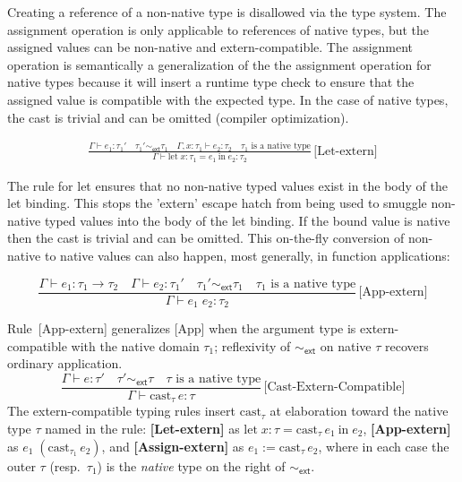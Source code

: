 \documentclass[11pt,a4paper]{article}
\begin{document}
Creating  a reference of a non-native type is disallowed via the type system.
The assignment operation is only applicable to references of native types, but the assigned values can be non-native and extern-compatible. The assignment operation is semantically a generalization of the the assignment operation for native types because it will insert a runtime type check to ensure that the assigned value is compatible with the expected type. In the case of native types, the cast is trivial and can be omitted (compiler optimization).

\begin{gather*}
  \frac{\Gamma \vdash e_1 : \tau_1' \quad \tau_1' \sim_{\textsf{ext}} \tau_1 \quad \Gamma, x{:}\tau_1 \vdash e_2 : \tau_2 \quad \text{$\tau_1$ is a native type}}{\Gamma \vdash \text{let}\; x{:}\tau_1 = e_1\ \text{in}\; e_2 : \tau_2}\,\text{[{Let-extern}]}
\end{gather*}

The rule for let ensures that no non-native typed values exist in the body of the let binding. 
This stops the 'extern' escape hatch from being used to smuggle non-native typed values into the body of the let binding.
If the bound value is native then the cast is trivial and can be omitted.
This on-the-fly conversion of non-native to native values can also happen, most generally, in function applications: 

\[
  \frac{\Gamma \vdash e_1 : \tau_1 \to \tau_2 \quad \Gamma \vdash e_2 : \tau_1' \quad \tau_1' \sim_{\textsf{ext}} \tau_1 \quad \text{$\tau_1$ is a native type}}{\Gamma \vdash e_1\; e_2 : \tau_2}\,\text{[App-extern]}
\]

Rule~\textsf{[App-extern]} generalizes \textsf{[App]} when the argument type is extern-compatible with the native domain $\tau_1$; reflexivity of $\sim_{\textsf{ext}}$ on native $\tau$ recovers ordinary application.
\[
  \frac{\Gamma \vdash e : \tau' \quad \tau' \sim_{\textsf{ext}} \tau \quad \text{$\tau$ is a native type}}{\Gamma \vdash \text{cast}_{\tau}\, e : \tau}\,\text{[Cast-Extern-Compatible]}
\]
The extern-compatible typing rules insert $\text{cast}_{\tau}$ at elaboration toward the native type $\tau$ named in the rule: \textbf{[Let-extern]} as $\text{let}\; x{:}\tau = \text{cast}_{\tau}\, e_1\ \text{in}\; e_2$, \textbf{[App-extern]} as $e_1\; (\text{cast}_{\tau_1}\, e_2)$, and \textbf{[{Assign-extern}]} as $e_1 \mathrel{:=} \text{cast}_{\tau}\, e_2$, where in each case the outer $\tau$ (resp.\ $\tau_1$) is the \emph{native} type on the right of $\sim_{\textsf{ext}}$.
\end{document}
